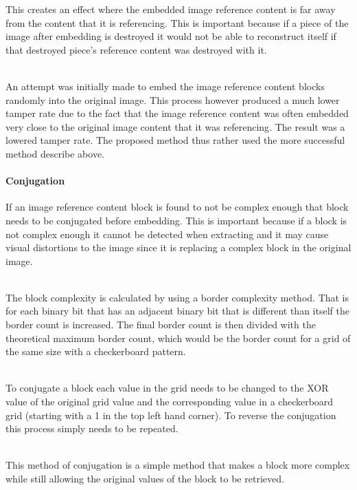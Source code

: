 \documentclass[12pt]{article}
\begin{document}
This creates an effect where the embedded image reference content is far away from the content that it is referencing.
This is important because if a piece of the image after embedding is destroyed it would not be able to reconstruct itself if that destroyed piece's reference content was destroyed with it.

\hspace{0pt} \\
An attempt was initially made to embed the image reference content blocks randomly into the original image.
This process however produced a much lower tamper rate due to the fact that the image reference content was often embedded very close to the original image content that it was referencing.
The result was a lowered tamper rate.
The proposed method thus rather used the more successful method describe above.

\paragraph{Conjugation}
If an image reference content block is found to not be complex enough that block needs to be conjugated before embedding.
This is important because if a block is not complex enough it cannot be detected when extracting and it may cause visual distortions to the image since it is replacing a complex block in the original image.

\hspace{0pt} \\
The block complexity is calculated by using a border complexity method. \cite{beaullieubpcs}
That is for each binary bit that has an adjacent binary bit that is different than itself the border count is increased. 
The final border count is then divided with the theoretical maximum border count, which would be the border count for a grid of the same size with a checkerboard pattern.

\hspace{0pt} \\
To conjugate a block each value in the grid needs to be changed to the XOR value of the original grid value and the corresponding value in a checkerboard grid (starting with a 1 in the top left hand corner).
To reverse the conjugation this process simply needs to be repeated.

\hspace{0pt} \\
This method of conjugation is a simple method that makes a block more complex while still allowing the original values of the block to be retrieved.
\end{document}
